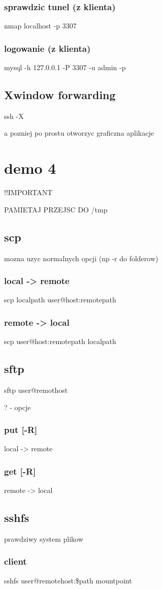 \documentclass[11pt]{article}
\begin{document}
\subsubsection{sprawdzic tunel (z klienta)}
\label{sec:org275ac07}
nmap localhost -p 3307
\subsubsection{logowanie (z klienta)}
\label{sec:org7abae57}
mysql -h 127.0.0.1 -P 3307 -u admin -p
\subsection{Xwindow forwarding}
\label{sec:orgba73e40}
ssh -X

a pozniej po prostu otworzyc graficzna aplikacje
\section{demo 4}
\label{sec:org1a252d4}
!!IMPORTANT

PAMIETAJ PRZEJSC DO /tmp
\subsection{scp}
\label{sec:orgda13acb}
mozna uzyc normalnych opcji (np -r do folderow)
\subsubsection{local -> remote}
\label{sec:org5d72fd3}
scp localpath user@host:remotepath
\subsubsection{remote -> local}
\label{sec:org15a6e8e}
scp user@host:remotepath localpath
\subsection{sftp}
\label{sec:org16a858c}
sftp user@remothost

? - opcje
\subsubsection{put [-R]}
\label{sec:org6651bed}
local -> remote
\subsubsection{get [-R]}
\label{sec:org1cc16d9}
remote -> local
\subsection{sshfs}
\label{sec:orgf595c49}
prawdziwy system plikow
\subsubsection{client}
\label{sec:orgbbdc1bf}
sshfs user@remotehost:\$path mountpoint
\end{document}
